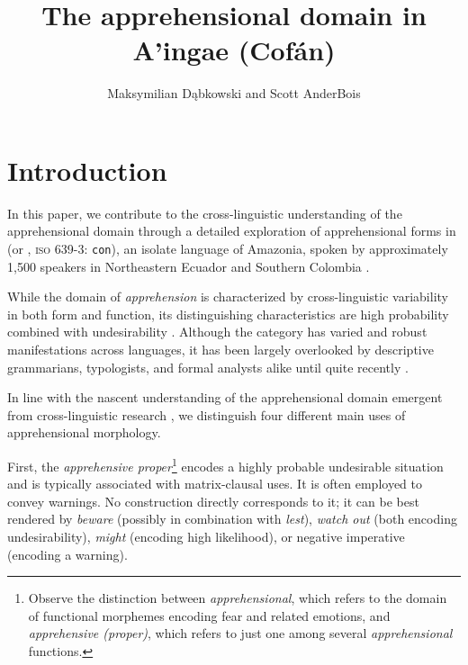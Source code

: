 \documentclass[output=paper,colorlinks,citecolor=brown]{langscibook}
\author{Maksymilian Dąbkowski\affiliation{University of California, Berkeley} and Scott AnderBois\affiliation{Brown University}}
\title{The apprehensional domain in A'ingae (Cofán)}
\begin{document}


\maketitle




\section{Introduction}
\label{sec:introduction}

In this paper, we contribute to the cross-linguistic understanding of the apprehensional domain through a detailed exploration of apprehensional forms in  (or , {\textsc{iso} 639-3}: \texttt{con}), an isolate language of Amazonia, spoken by approximately 1,500 speakers in Northeastern Ecuador and Southern Colombia \citep{dabkowski2021ldd}.

While the domain of \textit{apprehension} is characterized by cross-linguistic variability in both form and function, its distinguishing characteristics are high probability combined with undesirability \citep{vuillermet2018a}. Although the category has varied and robust manifestations across languages, it has been largely overlooked by descriptive grammarians, typologists, and formal analysts alike until quite recently
\citep[for extant descriptions, see][]{lichtenberk1995apprehensional, green1989marrithiyel, francois2003semantique, dobrushina2006grammatical, pakendorf2007possibility, angelo2016beware, vuillermet2018a}.

In line with the nascent understanding of the apprehensional domain emergent from cross-linguistic research \citep{VuillermetM2018questionnaire}, we distinguish four different main uses of apprehensional morphology.

First, the \emph{apprehensive proper}\footnote{Observe the distinction between \textit{apprehensional}, which refers to the domain of functional morphemes encoding fear and related emotions, and \textit{apprehensive (proper)}, which refers to just one among several \textit{apprehensional} functions.} encodes a highly probable undesirable situation and is typically associated with matrix-clausal uses. It is often employed to convey warnings. No  construction directly corresponds to it; it can be best rendered by \emph{beware} (possibly in combination with \emph{lest}), \emph{watch out} (both encoding undesirability), \emph{might} (encoding high likelihood), or negative imperative (encoding a warning).
\end{document}
